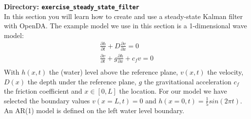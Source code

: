 {\bf Directory: {\tt exercise\_steady\_state\_filter}}\\

  In this section you will learn how to create and use a steady-state Kalman
  filter with OpenDA. The example model we use in this section is a
  1-dimensional wave model:
  \begin{eqnarray}
  \frac{\partial h}{\partial t} + D \frac{\partial v}{\partial x} = 0 \\
  \frac{\partial v}{\partial t} + g \frac{\partial h}{\partial x} + c_f v = 0 \\
  \end{eqnarray}
  With $h(x,t)$ the (water) level above the reference plane, $v(x,t)$ the
  velocity, $D(x)$ the depth under the reference plane, $g$ the gravitational
  acceleration $c_f$ the friction coefficient and $x\in [0,L]$ the location.
  For our model we have selected the boundary values $v(x=L,t)=0$ and
  $h(x=0,t)=\frac{1}{5} sin(2 \pi t)$. An AR(1) model is defined on the left
  water level boundary.

